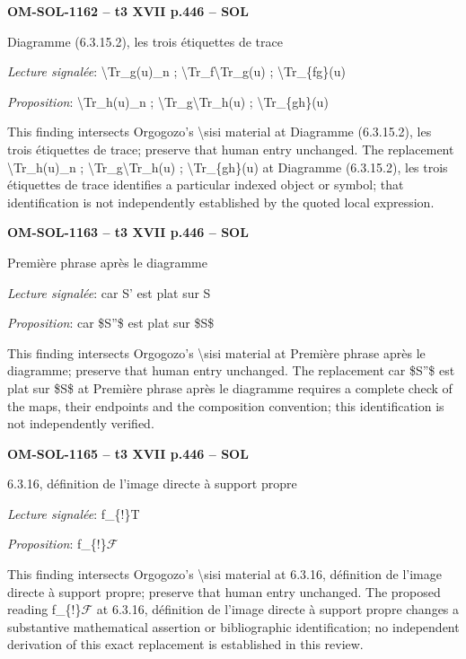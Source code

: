 \par\noindent\textbf{OM-SOL-1162 -- t3 XVII p.446 -- SOL}\par
Diagramme (6.3.15.2), les trois étiquettes de trace\par
\emph{Lecture signalée}: \textbackslash{}Tr\_g(u)\_n ; \textbackslash{}Tr\_f\textbackslash{}Tr\_g(u) ; \textbackslash{}Tr\_\{fg\}(u)\par
\emph{Proposition}: \textbackslash{}Tr\_h(u)\_n ; \textbackslash{}Tr\_g\textbackslash{}Tr\_h(u) ; \textbackslash{}Tr\_\{gh\}(u)\par
This finding intersects Orgogozo's \textbackslash{}sisi material at Diagramme (6.3.15.2), les trois étiquettes de trace; preserve that human entry unchanged. The replacement \textbackslash{}Tr\_h(u)\_n ; \textbackslash{}Tr\_g\textbackslash{}Tr\_h(u) ; \textbackslash{}Tr\_\{gh\}(u) at Diagramme (6.3.15.2), les trois étiquettes de trace identifies a particular indexed object or symbol; that identification is not independently established by the quoted local expression.\par
\par\noindent\textbf{OM-SOL-1163 -- t3 XVII p.446 -- SOL}\par
Première phrase après le diagramme\par
\emph{Lecture signalée}: car S' est plat sur S\par
\emph{Proposition}: car \$S''\$ est plat sur \$S\$\par
This finding intersects Orgogozo's \textbackslash{}sisi material at Première phrase après le diagramme; preserve that human entry unchanged. The replacement car \$S''\$ est plat sur \$S\$ at Première phrase après le diagramme requires a complete check of the maps, their endpoints and the composition convention; this identification is not independently verified.\par
\par\noindent\textbf{OM-SOL-1165 -- t3 XVII p.446 -- SOL}\par
6.3.16, définition de l'image directe à support propre\par
\emph{Lecture signalée}: f\_\{!\}T\par
\emph{Proposition}: f\_\{!\}\ensuremath{\mathcal{F}}\par
This finding intersects Orgogozo's \textbackslash{}sisi material at 6.3.16, définition de l'image directe à support propre; preserve that human entry unchanged. The proposed reading f\_\{!\}\ensuremath{\mathcal{F}} at 6.3.16, définition de l'image directe à support propre changes a substantive mathematical assertion or bibliographic identification; no independent derivation of this exact replacement is established in this review.\par
